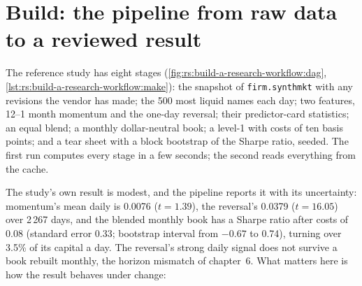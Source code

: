 \section{Build: the pipeline from raw data to a reviewed result}

The reference study has eight stages (\cref{fig:rs:build-a-research-workflow:dag}, \cref{lst:rs:build-a-research-workflow:make}): the snapshot of
\texttt{firm.synthmkt} with any revisions the vendor has made; the 500 most liquid names each day; two features, 12--1 month momentum and the one-day reversal;
their predictor-card statistics; an equal blend; a monthly dollar-neutral book; a level-1  with costs of ten basis points; and a tear sheet with a block
bootstrap of the Sharpe ratio, seeded. The first run computes every stage in a few seconds; the second reads everything from the cache.

\begin{omfigure}

\label{fig:rs:build-a-research-workflow:dag}
\end{omfigure}

The study's own result is modest, and the pipeline reports it with its uncertainty: momentum's mean daily  is 0.0076 ($t = 1.39$), the
reversal's 0.0379 ($t = 16.05$) over 2\,267 days, and the blended monthly book has a Sharpe ratio after costs of 0.08 (standard error 0.33; bootstrap interval from
$-0.67$ to 0.74), turning over 3.5\% of its capital a day. The reversal's strong daily signal does not survive a book rebuilt monthly, the horizon mismatch of
chapter~6. What matters here is how the result behaves under change:

